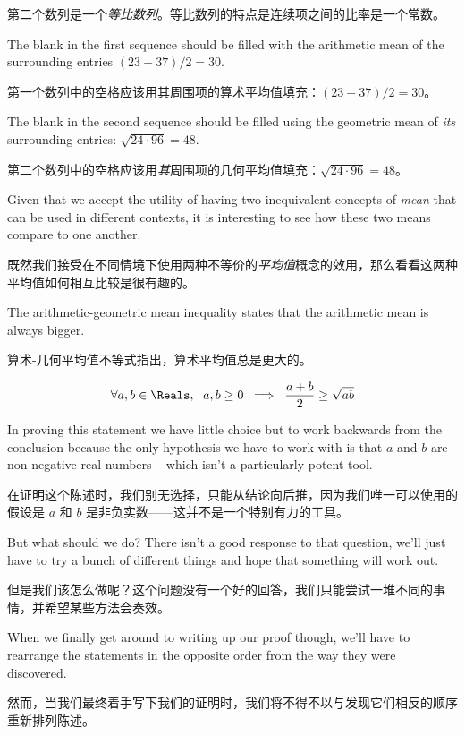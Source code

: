 第二个数列是一个\emph{等比数列}。等比数列的特点是连续项之间的比率是一个常数。

The blank in the first sequence should be filled with the 
arithmetic mean of the surrounding entries $(23+37)/2 = 30$.

第一个数列中的空格应该用其周围项的算术平均值填充：$(23+37)/2 = 30$。

The blank 
in the second sequence should be filled using the 
geometric mean
of \emph{its} surrounding entries: $\sqrt{24\cdot 96} = 48$.

第二个数列中的空格应该用\emph{其}周围项的几何平均值填充：$\sqrt{24\cdot 96} = 48$。

Given that we accept the utility of having two inequivalent concepts
of \emph{mean} that can be used in different contexts, it is interesting
to see how these two means compare to one another.

既然我们接受在不同情境下使用两种不等价的\emph{平均值}概念的效用，那么看看这两种平均值如何相互比较是很有趣的。

The 
arithmetic-geometric mean inequality states that the arithmetic mean 
is always bigger.

算术-几何平均值不等式指出，算术平均值总是更大的。

\[ \forall a,b \in \Reals, \rule{6pt}{0pt}  a,b \geq 0 \; \implies \; \frac{a+b}{2} \geq \sqrt{ab} \]

In proving this statement we have little choice but to work backwards
from the conclusion because the only hypothesis we have to work with
is that $a$ and $b$ are non-negative real numbers -- which isn't a 
particularly potent tool.

在证明这个陈述时，我们别无选择，只能从结论向后推，因为我们唯一可以使用的假设是 $a$ 和 $b$ 是非负实数——这并不是一个特别有力的工具。

But what should we do?  
There isn't a good response to that 
question, we'll just have to try a bunch of different things and hope
that something will work out.

但是我们该怎么做呢？这个问题没有一个好的回答，我们只能尝试一堆不同的事情，并希望某些方法会奏效。

When we finally get around to writing up
our proof though, we'll have to rearrange the statements in the opposite 
order from the way they were discovered.

然而，当我们最终着手写下我们的证明时，我们将不得不以与发现它们相反的顺序重新排列陈述。

